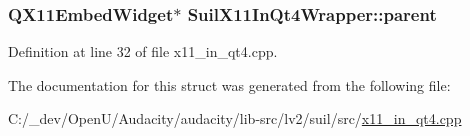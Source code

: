 \subsubsection[{\texorpdfstring{parent}{parent}}]{\setlength{\rightskip}{0pt plus 5cm}Q\+X11\+Embed\+Widget$\ast$ Suil\+X11\+In\+Qt4\+Wrapper\+::parent}\hypertarget{struct_suil_x11_in_qt4_wrapper_a1bc52a3b721b93e1a95bc53bc7c461ad}{}\label{struct_suil_x11_in_qt4_wrapper_a1bc52a3b721b93e1a95bc53bc7c461ad}


Definition at line 32 of file x11\+\_\+in\+\_\+qt4.\+cpp.



The documentation for this struct was generated from the following file\+:\begin{DoxyCompactItemize}
\item 
C\+:/\+\_\+dev/\+Open\+U/\+Audacity/audacity/lib-\/src/lv2/suil/src/\hyperlink{x11__in__qt4_8cpp}{x11\+\_\+in\+\_\+qt4.\+cpp}\end{DoxyCompactItemize}

